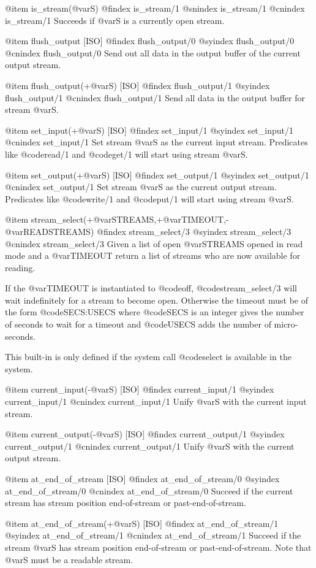 {{{{@item is_stream(@var{S})
@findex is_stream/1
@snindex is_stream/1
@cnindex is_stream/1
Succeeds if @var{S} is a currently open stream.

@item flush_output [ISO]
@findex flush_output/0
@syindex flush_output/0
@cnindex flush_output/0
Send out all data in the output buffer of the current output stream.

@item flush_output(+@var{S}) [ISO]
@findex flush_output/1
@syindex flush_output/1
@cnindex flush_output/1
Send all data in the output buffer for stream @var{S}.

@item set_input(+@var{S}) [ISO]
@findex set_input/1
@syindex set_input/1
@cnindex set_input/1
Set stream @var{S} as the current input stream. Predicates like @code{read/1}
and @code{get/1} will start using stream @var{S}.

@item set_output(+@var{S}) [ISO]
@findex set_output/1
@syindex set_output/1
@cnindex set_output/1
Set stream @var{S} as the current output stream. Predicates like
@code{write/1} and @code{put/1} will start using stream @var{S}.

@item stream_select(+@var{STREAMS},+@var{TIMEOUT},-@var{READSTREAMS})
@findex stream_select/3
@syindex stream_select/3
@cnindex stream_select/3
Given a list of open @var{STREAMS} opened in read mode and a @var{TIMEOUT}
return a list of streams who are now available for reading. 

If the @var{TIMEOUT} is instantiated to @code{off},
@code{stream_select/3} will wait indefinitely for a stream to become
open. Otherwise the timeout must be of the form @code{SECS:USECS} where
@code{SECS} is an integer gives the number of seconds to wait for a timeout
and @code{USECS} adds the number of micro-seconds.

This built-in is only defined if the system call @code{select} is
available in the system.

@item current_input(-@var{S}) [ISO]
@findex current_input/1
@syindex current_input/1
@cnindex current_input/1
Unify @var{S} with the current input stream.

@item current_output(-@var{S}) [ISO]
@findex current_output/1
@syindex current_output/1
@cnindex current_output/1
Unify @var{S} with the current output stream.

@item at_end_of_stream [ISO]
@findex at_end_of_stream/0
@syindex at_end_of_stream/0
@cnindex at_end_of_stream/0
Succeed if the current stream has stream position end-of-stream or
past-end-of-stream.

@item at_end_of_stream(+@var{S}) [ISO]
@findex at_end_of_stream/1
@syindex at_end_of_stream/1
@cnindex at_end_of_stream/1
Succeed if the stream @var{S} has stream position end-of-stream or
past-end-of-stream. Note that @var{S} must be a readable stream.

}}}}
